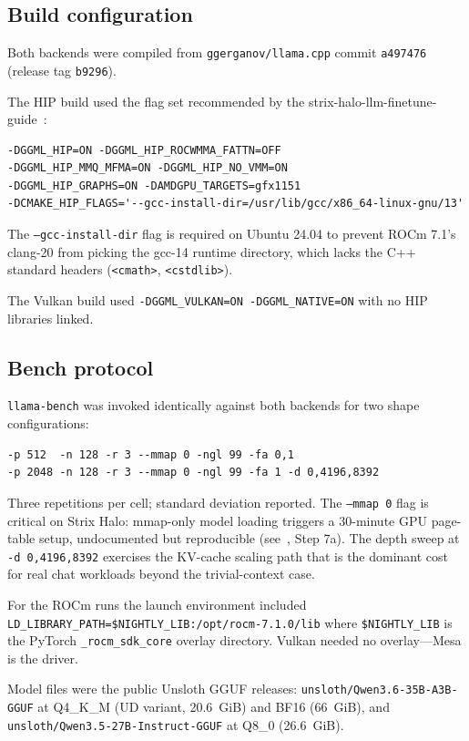 \documentclass[10pt,a4paper]{article}
\begin{document}
\subsection{Build configuration}

Both backends were compiled from \texttt{ggerganov/llama.cpp} commit \texttt{a497476} (release tag \texttt{b9296}).

The HIP build used the flag set recommended by the strix-halo-llm-finetune-guide~\cite{guide}:
\begin{verbatim}
-DGGML_HIP=ON -DGGML_HIP_ROCWMMA_FATTN=OFF
-DGGML_HIP_MMQ_MFMA=ON -DGGML_HIP_NO_VMM=ON
-DGGML_HIP_GRAPHS=ON -DAMDGPU_TARGETS=gfx1151
-DCMAKE_HIP_FLAGS='--gcc-install-dir=/usr/lib/gcc/x86_64-linux-gnu/13'
\end{verbatim}
\noindent The \texttt{--gcc-install-dir} flag is required on Ubuntu 24.04 to prevent ROCm 7.1's clang-20 from picking the gcc-14 runtime directory, which lacks the C++ standard headers (\texttt{<cmath>}, \texttt{<cstdlib>}).

The Vulkan build used \texttt{-DGGML\_VULKAN=ON -DGGML\_NATIVE=ON} with no HIP libraries linked.

\subsection{Bench protocol}

\texttt{llama-bench} was invoked identically against both backends for two shape configurations:
\begin{verbatim}
-p 512  -n 128 -r 3 --mmap 0 -ngl 99 -fa 0,1
-p 2048 -n 128 -r 3 --mmap 0 -ngl 99 -fa 1 -d 0,4196,8392
\end{verbatim}
\noindent Three repetitions per cell; standard deviation reported. The \texttt{--mmap 0} flag is critical on Strix Halo: mmap-only model loading triggers a 30-minute GPU page-table setup, undocumented but reproducible (see~\cite{guide}, Step 7a). The depth sweep at \texttt{-d 0,4196,8392} exercises the KV-cache scaling path that is the dominant cost for real chat workloads beyond the trivial-context case.

For the ROCm runs the launch environment included \texttt{LD\_LIBRARY\_PATH=\$NIGHTLY\_LIB:/opt/rocm-7.1.0/lib} where \texttt{\$NIGHTLY\_LIB} is the PyTorch \texttt{\_rocm\_sdk\_core} overlay directory. Vulkan needed no overlay---Mesa is the driver.

Model files were the public Unsloth GGUF releases: \texttt{unsloth/Qwen3.6-35B-A3B-GGUF} at Q4\_K\_M (UD variant, 20.6~GiB) and BF16 (66~GiB), and \texttt{unsloth/Qwen3.5-27B-Instruct-GGUF} at Q8\_0 (26.6~GiB).
\end{document}
